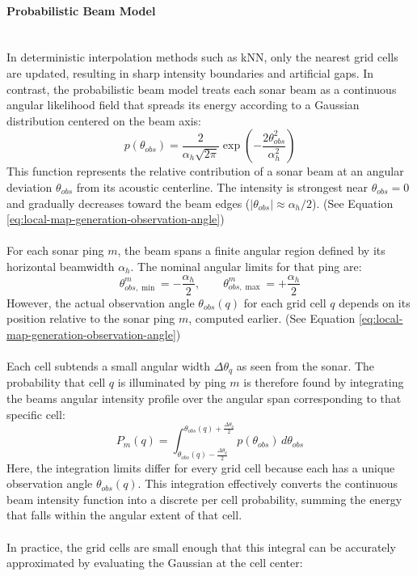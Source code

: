 \paragraph{Probabilistic Beam Model} \mbox{}\\[0.5em] \noindent
In deterministic interpolation methods such as kNN, only the nearest grid cells are updated, resulting in sharp intensity boundaries and artificial gaps. In contrast, the probabilistic beam model treats each sonar beam as a continuous angular likelihood field that spreads its energy according to a Gaussian distribution centered on the beam axis:
$$
    p(\theta_{obs}) = \frac{2}{\alpha_h \sqrt{2\pi}} 
    \exp\left(-\frac{2\theta_{obs}^2}{\alpha_h^2}\right)
$$
This function represents the relative contribution of a sonar beam at an angular deviation $\theta_{obs}$ from its acoustic centerline. The intensity is strongest near $\theta_{obs} = 0$ and gradually decreases toward the beam edges ($|\theta_{obs}| \approx \alpha_h / 2$). (See Equation \ref{eq:local-map-generation-observation-angle})  
\\ \\
For each sonar ping $m$, the beam spans a finite angular region defined by its horizontal beamwidth $\alpha_h$.  
The nominal angular limits for that ping are:
$$
    \theta_{obs,\min}^m = -\frac{\alpha_h}{2}, \qquad 
    \theta_{obs,\max}^m = +\frac{\alpha_h}{2}
$$
However, the actual observation angle $\theta_{obs}(q)$ for each grid cell $q$ depends on its position relative to the sonar ping $m$, computed earlier. (See Equation \ref{eq:local-map-generation-observation-angle})
\\ \\
Each cell subtends a small angular width $\Delta \theta_q$ as seen from the sonar. The probability that cell $q$ is illuminated by ping $m$ is therefore found by integrating the beams angular intensity profile over the angular span corresponding to that specific cell:
$$
    P_m(q) = \int_{\theta_{obs}(q) - \frac{\Delta \theta_q}{2}}^{\theta_{obs}(q) + \frac{\Delta \theta_q}{2}} p(\theta_{obs}) \, d\theta_{obs}
$$
Here, the integration limits differ for every grid cell because each has a unique observation angle $\theta_{obs}(q)$.  
This integration effectively converts the continuous beam intensity function into a discrete per cell probability, summing the energy that falls within the angular extent of that cell.
\\ \\
In practice, the grid cells are small enough that this integral can be accurately approximated by evaluating the Gaussian at the cell center:
